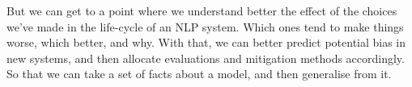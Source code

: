 But we can get to a point where we understand better the effect of the choices we've made in the life-cycle of an NLP system. Which ones tend to make things worse, which better, and why. With that, we can better predict potential bias in new systems, and then allocate evaluations and mitigation methods accordingly. So that we can take a set of facts about a model, and then generalise from it. %













